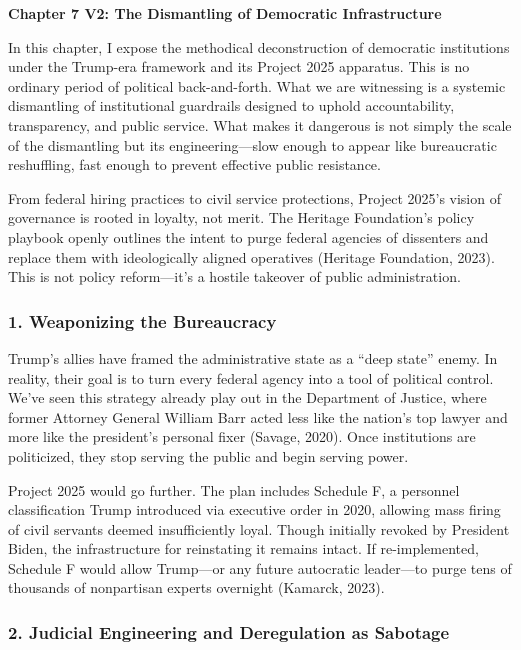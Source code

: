 \documentclass[
]{article}
\author{}
\date{}
\begin{document}
\textbf{Chapter 7 V2: The Dismantling of Democratic Infrastructure}

In this chapter, I expose the methodical deconstruction of democratic institutions under the Trump-era framework and its Project 2025 apparatus. This is no ordinary period of political back-and-forth. What we are witnessing is a systemic dismantling of institutional guardrails designed to uphold accountability, transparency, and public service. What makes it dangerous is not simply the scale of the dismantling but its engineering---slow enough to appear like bureaucratic reshuffling, fast enough to prevent effective public resistance.

From federal hiring practices to civil service protections, Project 2025's vision of governance is rooted in loyalty, not merit. The Heritage Foundation's policy playbook openly outlines the intent to purge federal agencies of dissenters and replace them with ideologically aligned operatives (Heritage Foundation, 2023). This is not policy reform---it's a hostile takeover of public administration.

\subsubsection{\texorpdfstring{1. \textbf{Weaponizing the Bureaucracy}}{1. Weaponizing the Bureaucracy}}\label{weaponizing-the-bureaucracy}

Trump's allies have framed the administrative state as a ``deep state'' enemy. In reality, their goal is to turn every federal agency into a tool of political control. We've seen this strategy already play out in the Department of Justice, where former Attorney General William Barr acted less like the nation's top lawyer and more like the president's personal fixer (Savage, 2020). Once institutions are politicized, they stop serving the public and begin serving power.

Project 2025 would go further. The plan includes Schedule F, a personnel classification Trump introduced via executive order in 2020, allowing mass firing of civil servants deemed insufficiently loyal. Though initially revoked by President Biden, the infrastructure for reinstating it remains intact. If re-implemented, Schedule F would allow Trump---or any future autocratic leader---to purge tens of thousands of nonpartisan experts overnight (Kamarck, 2023).

\subsubsection{\texorpdfstring{2. \textbf{Judicial Engineering and Deregulation as Sabotage}}{2. Judicial Engineering and Deregulation as Sabotage}}\label{judicial-engineering-and-deregulation-as-sabotage}
\end{document}
